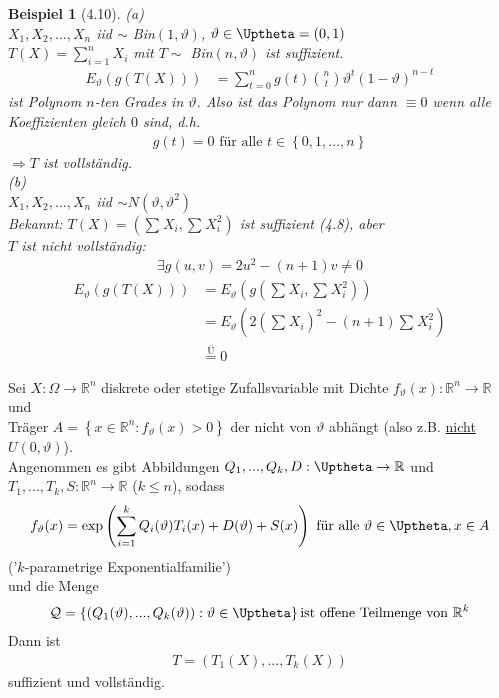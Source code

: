 \documentclass[a4paper,openany]{book}
\theoremstyle{mytheoremstyle}
\newtheorem*{bei}{Beispiel}
\theoremstyle{mytheoremstyle2}
\begin{document}
\begin{bei}[4.10]
  (a) \\
  $X_1,X_2,...,X_n $ iid $\sim$ Bin$(1, \vartheta )$, $\vartheta \in \Uptheta=(0,1)$ \\
  $T(X)=\sum_{i=1}^{n}{X_i}$ mit $T \sim$ Bin$(n, \vartheta )$ ist suffizient.  
  \begin{align*}
    E _{\vartheta }(g(T(X)))
    &=\sum_{t=0}^{n}{g(t)\binom{n}{t}\vartheta ^t(1-\vartheta )^{n-t}}
  \end{align*}
  ist Polynom $n$-ten Grades in $\vartheta $. Also ist das Polynom nur dann $\equiv 0$ wenn alle Koeffizienten gleich $0$ sind, d.h. 
  \begin{align*}
    g(t)=0 \text{ für alle }t \in \left\{0,1,...,n\right\}
  \end{align*}
  $\Rightarrow T$ ist vollständig. \\
  (b) \\
  $X_1,X_2,...,X_n $ iid $\sim N(\vartheta ,\vartheta ^2)$ \\
  Bekannt: $T(X)=(\sum_{}^{}{X_i},\sum_{}^{}{X_i^2})$ ist suffizient (4.8), aber \\
  $T$ ist nicht vollständig: 
  \begin{align*}
    \exists g(u,v)=2u^2-(n+1)v \neq 0
  \end{align*}
  \begin{align*}
    E _{\vartheta }(g(T(X)))
    &=E _{\vartheta }(g(\sum_{}^{}{X_i},\sum_{}^{}{X_i^2})) \\
    &=E _{\vartheta }\left(2 (\sum_{}^{}{X_i})^2-(n+1)\sum_{}^{}{X_i^2}\right) \\
    &\overset{\text{Ü}}=0
  \end{align*}
\end{bei}
\begin{theo}{4.11}{}
  Sei $X:\Omega \to \mathbb{R}^n$ diskrete oder stetige Zufallsvariable mit Dichte $f _{\vartheta }(x):\mathbb{R}^n\to \mathbb{R}$ und \\
  Träger $A=\left\{x \in \mathbb{R}^n:f _{\vartheta }(x)>0\right\}$ der nicht von $\vartheta $ abhängt (also z.B. \underline{nicht} $U(0,\vartheta )$). \\
  Angenommen es gibt Abbildungen $Q_1,...,Q_k,D:\Uptheta \to \mathbb{R}$ und $T_1,...,T_k,S:\mathbb{R}^n\to \mathbb{R}$ ($k \leq n$), sodass
  \begin{align*}
    f _{\vartheta }(x)=\exp \left(\sum_{i=1}^{k}{Q_i(\vartheta )T_i(x)}+D(\vartheta )+S(x)\right) \text{ für alle }\vartheta \in \Uptheta, x \in A
  \end{align*}
  ('$k$-parametrige Exponentialfamilie') \\
  und die Menge
  \begin{align*}
    \mathcal{Q}=\left\{(Q_1(\vartheta ),...,Q_k(\vartheta )):\vartheta \in \Uptheta\right\} \text{ist offene Teilmenge von } \mathbb{R}^k
  \end{align*}
  Dann ist 
  \begin{align*}
    T=(T_1(X),...,T_k(X))
  \end{align*}
  suffizient und vollständig.
\end{theo}
\end{document}
